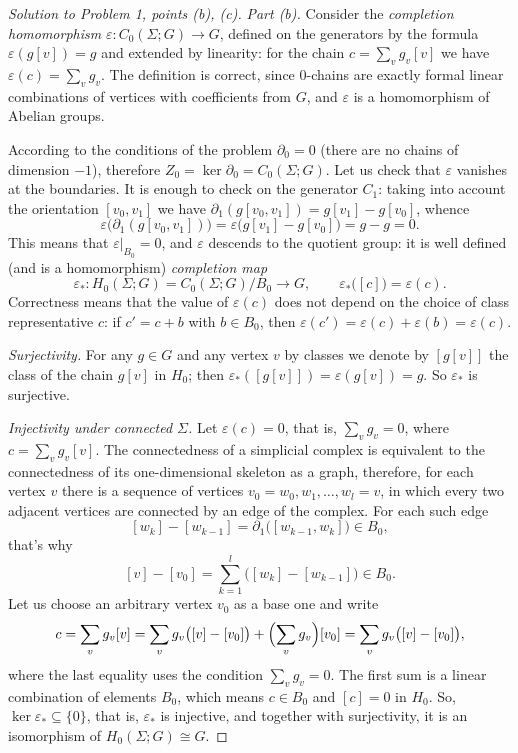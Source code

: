 \documentclass[a4paper,12pt]{report}
\begin{document}
\begin{proof}[Solution to Problem \textup{1}, points \textup{(b)}, \textup{(c)}]
\textit{Part \textup{(b)}.} Consider the \emph{ completion homomorphism} $\varepsilon\colon C_0(\Sigma;G)\to G$, defined on the generators by the formula $\varepsilon(g[v])=g$ and extended by linearity: for the chain $c=\sum_v g_v[v]$ we have $\varepsilon(c)=\sum_v g_v$. The definition is correct, since $0$-chains are exactly formal linear combinations of vertices with coefficients from $G$, and $\varepsilon$ is a homomorphism of Abelian groups.

According to the conditions of the problem $\partial_0=0$ \textup{(}there are no chains of dimension $-1$\textup{)}, therefore $Z_0=\ker\partial_0=C_0(\Sigma;G)$. Let us check that $\varepsilon$ vanishes at the boundaries. It is enough to check on the generator $C_1$: taking into account the orientation $[v_0,v_1]$ we have $\partial_1(g[v_0,v_1])=g[v_1]-g[v_0]$, whence
\[
\varepsilon\bigl(\partial_1(g[v_0,v_1])\bigr)=\varepsilon\bigl(g[v_1]-g[v_0]\bigr)=g-g=0 .
\]
This means that $\varepsilon|_{B_0}=0$, and $\varepsilon$ descends to the quotient group: it is well defined \textup{(}and is a homomorphism\textup{)} \emph{completion map}
\[
\varepsilon_*\colon H_0(\Sigma;G)=C_0(\Sigma;G)/B_0\to G,\qquad \varepsilon_*\bigl([c]\bigr)=\varepsilon(c).
\]
Correctness means that the value of $\varepsilon(c)$ does not depend on the choice of class representative $c$: if $c'=c+b$ with $b\in B_0$, then $\varepsilon(c')=\varepsilon(c)+\varepsilon(b)=\varepsilon(c)$.

\emph{Surjectivity.} For any $g\in G$ and any vertex $v$ by classes we denote by $[g[v]]$ the class of the chain $g[v]$ in $H_0$; then $\varepsilon_*([g[v]])=\varepsilon(g[v])=g$. So $\varepsilon_*$ is surjective.

\emph{Injectivity under connected $\Sigma$.} Let $\varepsilon(c)=0$, that is, $\sum_v g_v=0$, where $c=\sum_v g_v[v]$. The connectedness of a simplicial complex is equivalent to the connectedness of its one-dimensional skeleton as a graph, therefore, for each vertex $v$ there is a sequence of vertices $v_0=w_0,w_1,\dots,w_l=v$, in which every two adjacent vertices are connected by an edge of the complex. For each such edge
\[
[w_k]-[w_{k-1}]=\partial_1\bigl([w_{k-1},w_k]\bigr)\in B_0 ,
\]
that's why
\[
[v]-[v_0]=\sum_{k=1}^{l}\bigl([w_k]-[w_{k-1}]\bigr)\in B_0 .
\]
Let us choose an arbitrary vertex $v_0$ as a base one and write
\[
c=\sum_v g_v[v]=\sum_v g_v\bigl([v]-[v_0]\bigr)+\Bigl(\sum_v g_v\Bigr)[v_0]=\sum_v g_v\bigl([v]-[v_0]\bigr),
\]
where the last equality uses the condition $\sum_v g_v=0$. The first sum is a linear combination of elements $B_0$, which means $c\in B_0$ and $[c]=0$ in $H_0$. So, $\ker\varepsilon_*\subseteq\{0\}$, that is, $\varepsilon_*$ is injective, and together with surjectivity, it is an isomorphism of $H_0(\Sigma;G)\cong G$.


\end{proof}
\end{document}
